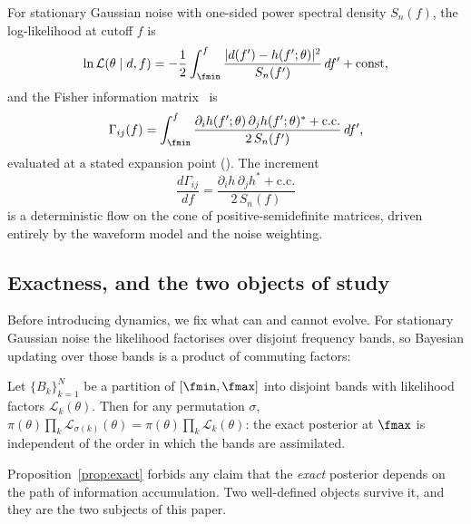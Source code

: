 For stationary Gaussian noise with one-sided power spectral density
$S_n(f)$, the log-likelihood at cutoff $f$ is
\begin{equation}
\ln \mathcal{L}(\theta \mid d, f) = -\frac12 \int_{\fmin}^{f}
\frac{|d(f') - h(f'; \theta)|^2}{S_n(f')}\,df' + \text{const},
\label{eq:likelihood}
\end{equation}
and the Fisher information matrix~\cite{cutler1994fisher,vallisneri2008fisher}
is
\begin{equation}
\Gamma_{ij}(f) = \int_{\fmin}^{f}
\frac{\partial_i h(f';\theta)\,\partial_j h(f';\theta)^{*} + \text{c.c.}}
{2\,S_n(f')}\,df',
\label{eq:fisher}
\end{equation}
evaluated at a stated expansion point (). The
increment
\begin{equation}
\frac{d\Gamma_{ij}}{df} =
\frac{\partial_i h\,\partial_j h^{*} + \text{c.c.}}{2\,S_n(f)}
\label{eq:fisher_flow}
\end{equation}
is a deterministic flow on the cone of positive-semidefinite matrices,
driven entirely by the waveform model and the noise weighting.

\subsection{Exactness, and the two objects of study}
\label{sec:exactness}

Before introducing dynamics, we fix what can and cannot evolve. For
stationary Gaussian noise the likelihood factorises over disjoint
frequency bands, so Bayesian updating over those bands is a product of
commuting factors:

\begin{proposition}
\label{prop:exact}
Let $\{B_k\}_{k=1}^{N}$ be a partition of $[\fmin,\fmax]$ into disjoint
bands with likelihood factors $\mathcal{L}_k(\theta)$. Then for any
permutation $\sigma$,
$\pi(\theta)\prod_k \mathcal{L}_{\sigma(k)}(\theta)
= \pi(\theta)\prod_k \mathcal{L}_{k}(\theta)$:
the exact posterior at $\fmax$ is independent of the order in which the
bands are assimilated.
\end{proposition}

Proposition~\ref{prop:exact} forbids any claim that the \emph{exact}
posterior depends on the path of information accumulation. Two
well-defined objects survive it, and they are the two subjects of this
paper.

